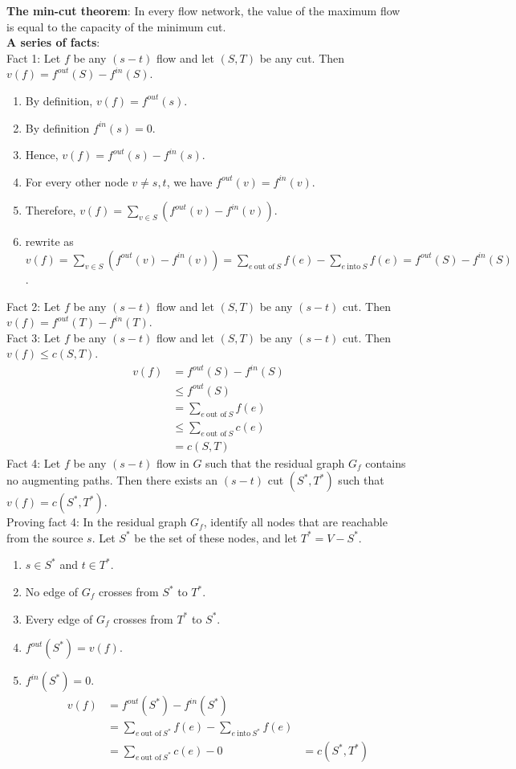 \documentclass[onecolumn]{report}
\begin{document}
\noindent
\textbf{The min-cut theorem}: In every flow network, the value of the maximum flow is equal to the capacity of the minimum cut.\\
\noindent
\textbf{A series of facts}:\\
Fact 1: Let $f$ be any $(s-t)$ flow and let $(S,T)$ be any cut. Then $v(f)=f^{out}(S)-f^{in}(S)$.\\
\begin{enumerate}
    \item By definition, $v(f)=f^{out}(s)$.
    \item By definition $f^{in}(s)=0$.
    \item Hence, $v(f)=f^{out}(s)-f^{in}(s)$.
    \item For every other node $v \neq s,t$, we have $f^{out}(v)=f^{in}(v)$.
    \item Therefore, $v(f)=\sum_{v\in S}(f^{out}(v)-f^{in}(v))$.
    \item rewrite as $v(f)=\sum_{v\in S}(f^{out}(v)-f^{in}(v))=\sum_{e \: \text{out of} \: S}f(e)-\sum_{e \: \text{into} \: S}f(e)=f^{out}(S)-f^{in}(S)$.
\end{enumerate}
Fact 2: Let $f$ be any $(s-t)$ flow and let $(S,T)$ be any $(s-t)$ cut. Then $v(f)=f^{out}(T)-f^{in}(T)$.\\
Fact 3: Let $f$ be any $(s-t)$ flow and let $(S,T)$ be any $(s-t)$ cut. Then $v(f) \leq c(S,T)$.\\
\begin{align*}
    v(f) &= f^{out}(S)-f^{in}(S)\\
    &\leq f^{out}(S)\\
    &= \sum_{e \: \text{out of} \: S}f(e)\\
    &\leq \sum_{e \: \text{out of} \: S}c(e)\\
    &= c(S,T)
\end{align*}
Fact 4: Let $f$ be any $(s-t)$ flow in $G$ such that the residual graph $G_f$ contains no augmenting paths. Then there exists an $(s-t)$ cut $(S^*,T^*)$ such that $v(f)=c(S^*,T^*)$.\\
Proving fact 4: In the residual graph $G_f$, identify all nodes that are reachable from the source $s$. Let $S^*$ be the set of these nodes, and let $T^*=V-S^*$.
\begin{enumerate}
    \item $s\in S^*$ and $t\in T^*$.
    \item No edge of $G_f$ crosses from $S^*$ to $T^*$.
    \item Every edge of $G_f$ crosses from $T^*$ to $S^*$.
    \item $f^{out}(S^*)=v(f)$.
    \item $f^{in}(S^*)=0$.
    \begin{align*}
        v(f) &= f^{out}(S^*)-f^{in}(S^*)\\
        &= \sum_{e \: \text{out of} \: S^*}f(e)-\sum_{e \: \text{into} \: S^*}f(e)\\
        &= \sum_{e \: \text{out of} \: S^*}c(e)-0
        &= c(S^*,T^*)
    \end{align*}
\end{enumerate}
\end{document}
